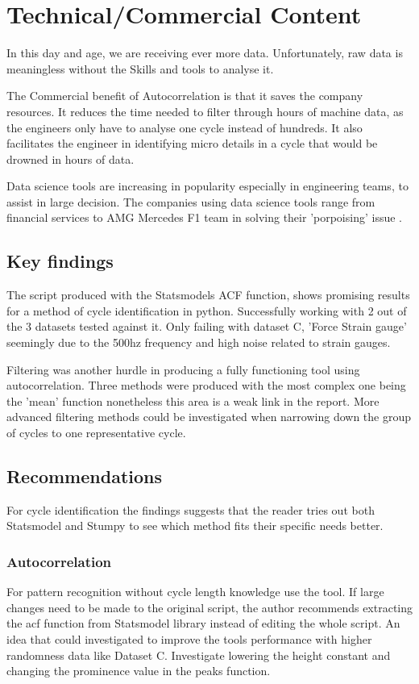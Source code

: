 \section{Technical/Commercial Content}

In this day and age, we are receiving ever more data. Unfortunately, raw data is meaningless without the Skills and tools to analyse it.

The Commercial benefit of Autocorrelation is that it saves the company resources. It reduces the time needed to filter through hours of machine data, as the engineers only have to analyse one cycle instead of hundreds. It also facilitates the engineer in identifying micro details in a cycle that would be drowned in hours of data. 

Data science tools are increasing in popularity especially in engineering teams, to assist in large decision. The companies using data science tools range from financial services to AMG Mercedes F1 team in solving their 'porpoising' issue \cite{mercedes}. 

\subsection{Key findings}
The script produced with the Statsmodels ACF function, shows promising results for a method of cycle identification in python. Successfully working with 2 out of the 3 datasets tested against it. Only failing with dataset C, 'Force Strain gauge' seemingly due to the 500hz frequency and high noise related to strain gauges.

Filtering was another hurdle in producing a fully functioning tool using autocorrelation. Three methods were produced with the most complex one being the 'mean' function nonetheless this area is a weak link in the report. More advanced filtering methods could be investigated when narrowing down the group of cycles to one representative cycle. 

\subsection{Recommendations}
For cycle identification the findings suggests that the reader tries out both Statsmodel and Stumpy to see which method fits their specific needs better. 
\subsubsection{Autocorrelation}
For pattern recognition without cycle length knowledge use the tool. If large changes need to be made to the original script, the author recommends extracting the acf function from Statsmodel library instead of editing the whole script. 
An idea that could investigated to improve the tools performance with higher randomness data like Dataset C. Investigate lowering the height constant and changing the prominence value in the peaks function. 

